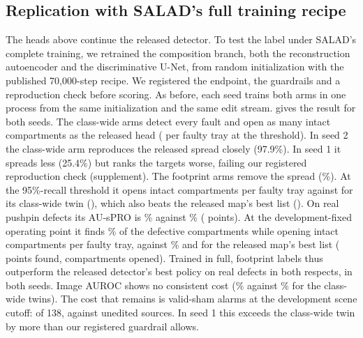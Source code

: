 \begin{table}[t]
\centering
\caption{Registered replication with SALAD's full 70{,}000-step recipe from random initialization (pushpins). Matched trays: spread (\%), wasted inspections $W$ and target recall $R$ (\%) at the development-fixed threshold, and pooled $W$. Real defects: AU-sPRO up to 5\% FPR and on extra pins (\%), defective compartments found (\%) and intact compartments opened per faulty tray at the development-fixed operating point, and image AUROC (\%). Bold marks the best retrained head.}
\label{tab:replication}
\small\setlength{\tabcolsep}{5pt}

\end{table}

\subsection{Replication with SALAD's full training recipe}
\label{sec:replication}
The heads above continue the released detector. To test the label under SALAD's complete training, we retrained the composition branch, both the reconstruction autoencoder and the discriminative U-Net, from random initialization with the published 70{,}000-step recipe. We registered the endpoint, the guardrails and a reproduction check before scoring. As before, each seed trains both arms in one process from the same initialization and the same edit stream.  gives the result for both seeds. The class-wide arms detect every fault and open as many intact compartments as the released head (\scrThrWCW{} per faulty tray at the threshold). In seed 2 the class-wide arm reproduces the released spread closely (97.9\%). In seed 1 it spreads less (25.4\%) but ranks the targets worse, failing our registered reproduction check (supplement). The footprint arms remove the spread (\scrSpreadFP\%). At the 95\%-recall threshold it opens \scrThrWFP{} intact compartments per faulty tray against \scrThrWCW{} for its class-wide twin (\scrDThrW), which also beats the released map's best list (\relListW). On real pushpin defects its AU-sPRO is \scrSproFP\% against \scrSproCW\% (\scrGain{} points). At the development-fixed operating point it finds \scrOpR\% of the defective compartments while opening \scrOpW{} intact compartments per faulty tray, against \opRelListR\% and \opRelListW{} for the released map's best list (\scrVsListR{} points found, \scrVsListW{} compartments opened). Trained in full, footprint labels thus outperform the released detector's best policy on real defects in both respects, in both seeds. Image AUROC shows no consistent cost (\scrAucFP\% against \scrAucCW\% for the class-wide twins). The cost that remains is valid-sham alarms at the development scene cutoff: \scrShamFP{} of 138, against \scrSrcFP{} unedited sources. In seed 1 this exceeds the class-wide twin by more than our registered guardrail allows.

